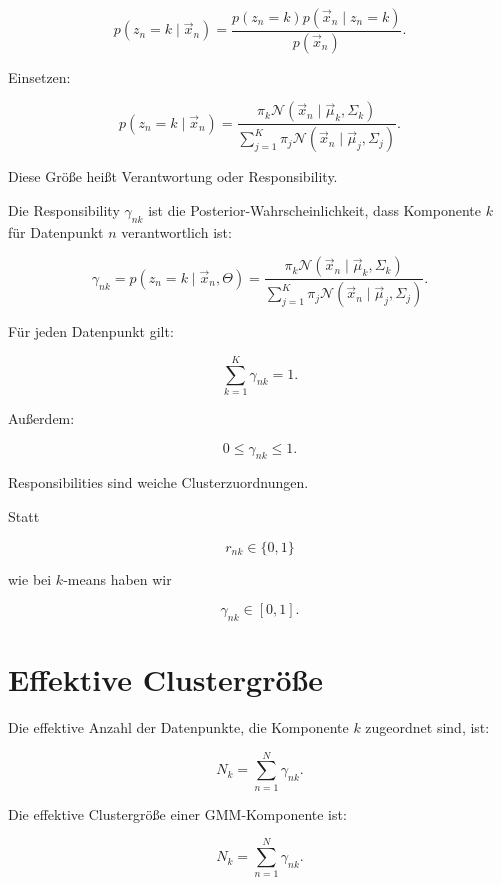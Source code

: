 \[
    p(z_n=k\mid\vec{x}_n)
    =
    \frac{
        p(z_n=k)p(\vec{x}_n\mid z_n=k)
    }{
        p(\vec{x}_n)
    }.
\]

Einsetzen:

\[
    p(z_n=k\mid\vec{x}_n)
    =
    \frac{
        \pi_k
        \mathcal{N}(\vec{x}_n\mid\vec{\mu}_k,\Sigma_k)
    }{
        \sum_{j=1}^{K}
        \pi_j
        \mathcal{N}(\vec{x}_n\mid\vec{\mu}_j,\Sigma_j)
    }.
\]

Diese Größe heißt Verantwortung oder Responsibility.

\begin{definitionbox}
Die Responsibility \(\gamma_{nk}\) ist die Posterior-Wahrscheinlichkeit, dass Komponente \(k\) für Datenpunkt \(n\) verantwortlich ist:

\[
    \gamma_{nk}
    =
    p(z_n=k\mid\vec{x}_n,\Theta)
    =
    \frac{
        \pi_k
        \mathcal{N}(\vec{x}_n\mid\vec{\mu}_k,\Sigma_k)
    }{
        \sum_{j=1}^{K}
        \pi_j
        \mathcal{N}(\vec{x}_n\mid\vec{\mu}_j,\Sigma_j)
    }.
\]
\end{definitionbox}

Für jeden Datenpunkt gilt:

\[
    \sum_{k=1}^{K}
    \gamma_{nk}=1.
\]

Außerdem:

\[
    0\leq\gamma_{nk}\leq 1.
\]

\begin{conceptbox}
Responsibilities sind weiche Clusterzuordnungen.

Statt

\[
    r_{nk}\in\{0,1\}
\]

wie bei \(k\)-means haben wir

\[
    \gamma_{nk}\in[0,1].
\]
\end{conceptbox}

\section{Effektive Clustergröße}

Die effektive Anzahl der Datenpunkte, die Komponente \(k\) zugeordnet sind, ist:

\[
    N_k
    =
    \sum_{n=1}^{N}
    \gamma_{nk}.
\]

\begin{definitionbox}
Die effektive Clustergröße einer GMM-Komponente ist:

\[
    N_k
    =
    \sum_{n=1}^{N}
    \gamma_{nk}.
\]
\end{definitionbox}

